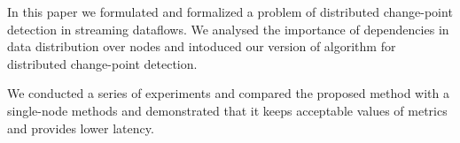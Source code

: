 \label {fs-lightbulbs-conclusion}

In this paper we formulated and formalized a problem of distributed change-point detection in streaming dataflows. We analysed the importance of dependencies in data distribution over nodes and intoduced our version of algorithm for distributed change-point detection.



We conducted a series of experiments and compared the proposed method with a single-node methods and demonstrated that it keeps acceptable values of metrics and provides lower latency.